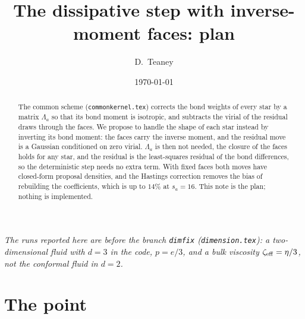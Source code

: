 \documentclass[11pt,aps,preprint,nofootinbib,superscriptaddress,tightenlines]{revtex4-2}
\begin{document}
\title{The dissipative step with inverse-moment faces: plan}
\author{D.~Teaney}
\date{\today}

\begin{abstract}
The common scheme (\texttt{commonkernel.tex}) corrects the bond weights of every star by a matrix $\Lambda_a$ so that its bond moment
is isotropic, and subtracts the virial of the residual draws through the faces.  We propose to handle the shape of each star instead
by inverting its bond moment: the faces carry the inverse moment, and the residual move is a Gaussian conditioned on zero virial.
$\Lambda_a$ is then not needed, the closure of the faces holds for any star, and the residual is the least-squares residual of the bond
differences, so the deterministic step needs no extra term.  With fixed faces both moves have closed-form proposal densities, and the
Hastings correction removes the bias of rebuilding the coefficients, which is up to $14\%$ at $s_a=16$.  This note is the plan; nothing
is implemented.
\end{abstract}

\maketitle

\noindent\emph{The runs reported here are before the branch \texttt{dimfix} (\texttt{dimension.tex}): a two-dimensional fluid with $d=3$ in the code,
$p=e/3$, and a bulk viscosity $\zeta_{\rm eff}=\eta/3$, not the conformal fluid in $d=2$.}

\section{The point}
\label{sec:point}
\end{document}
